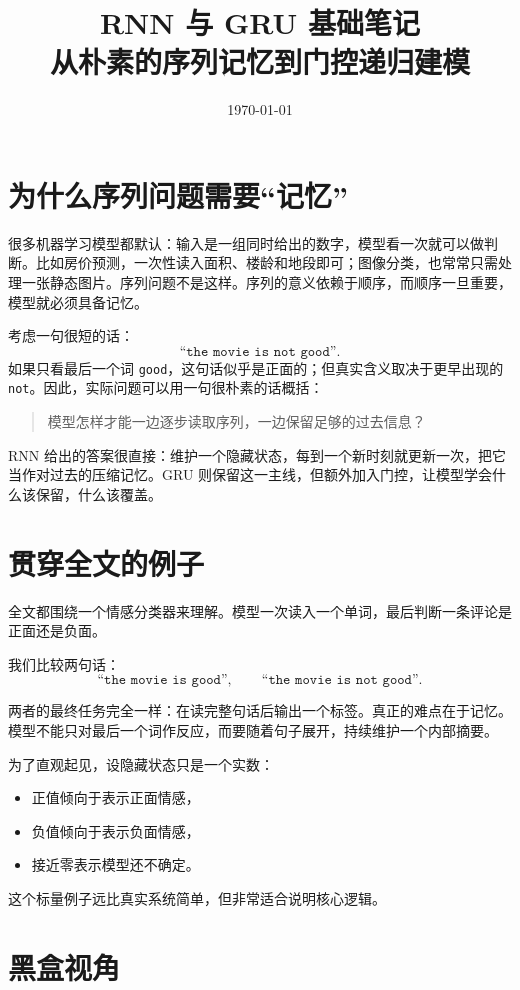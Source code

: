 \documentclass[12pt,a4paper]{ctexart}
\title{RNN 与 GRU 基础笔记\\
\large 从朴素的序列记忆到门控递归建模}
\author{}
\date{\today}
\begin{document}
\maketitle
\tableofcontents

\section{为什么序列问题需要“记忆”}

很多机器学习模型都默认：输入是一组同时给出的数字，模型看一次就可以做判断。比如房价预测，一次性读入面积、楼龄和地段即可；图像分类，也常常只需处理一张静态图片。序列问题不是这样。序列的意义依赖于顺序，而顺序一旦重要，模型就必须具备记忆。

考虑一句很短的话：
\[
\texttt{``the movie is not good''}.
\]
如果只看最后一个词 \texttt{good}，这句话似乎是正面的；但真实含义取决于更早出现的 \texttt{not}。因此，实际问题可以用一句很朴素的话概括：
\begin{quote}
模型怎样才能一边逐步读取序列，一边保留足够的过去信息？
\end{quote}

RNN 给出的答案很直接：维护一个隐藏状态，每到一个新时刻就更新一次，把它当作对过去的压缩记忆。GRU 则保留这一主线，但额外加入门控，让模型学会什么该保留，什么该覆盖。

\section{贯穿全文的例子}

全文都围绕一个情感分类器来理解。模型一次读入一个单词，最后判断一条评论是正面还是负面。

我们比较两句话：
\[
\texttt{``the movie is good''},
\qquad
\texttt{``the movie is not good''}.
\]

两者的最终任务完全一样：在读完整句话后输出一个标签。真正的难点在于记忆。模型不能只对最后一个词作反应，而要随着句子展开，持续维护一个内部摘要。

为了直观起见，设隐藏状态只是一个实数：
\begin{itemize}
  \item 正值倾向于表示正面情感，
  \item 负值倾向于表示负面情感，
  \item 接近零表示模型还不确定。
\end{itemize}

这个标量例子远比真实系统简单，但非常适合说明核心逻辑。

\section{黑盒视角}
\end{document}
